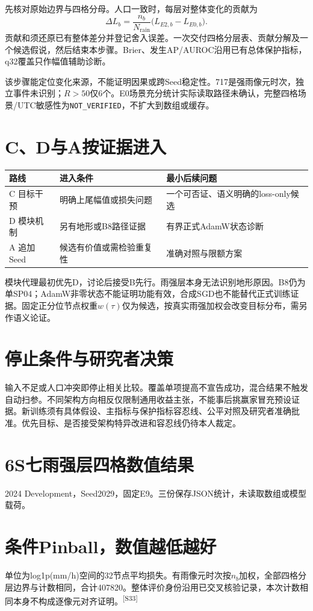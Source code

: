 \documentclass[UTF8,10.5pt,a4paper,fontset=none]{ctexart}
\newcommand{\evi}[1]{\textsuperscript{\color{muted}[#1]}}
\newcommand{\pageheading}[2]{\clearpage\section*{#1}\textcolor{muted}{#2}\par\vspace{3pt}}
\begin{document}
先核对原始边界与四格分母。人口一致时，每层对整体变化的贡献为
\[\Delta L_b=\frac{n_b}{N_{\mathrm{rain}}}\bigl(L_{E2,b}-L_{E0,b}\bigr).\]
贡献和须还原已有整体差分并登记舍入误差。一次交付四格分层表、贡献分解及一个候选假说，然后结束本步骤。Brier、发生AP/AUROC沿用已有总体保护指标，q32覆盖只作幅值辅助诊断。

该步骤能定位变化来源，不能证明因果或跨Seed稳定性。717是强雨像元时次，独立事件未识别；$R>50$仅6个。E0场景充分统计实际读取路径未确认，完整四格场景/UTC敏感性为\texttt{NOT\_VERIFIED}，不扩大到数组或缓存。

\section*{C、D与A按证据进入}
\begin{tabularx}{\textwidth}{@{}lXX@{}}
\toprule 路线 & 进入条件 & 最小后续问题\\\midrule
C 目标干预 & 明确上尾幅值或损失问题 & 一个可否证、语义明确的loss-only候选\\
D 模块机制 & 另有地形或B8路径证据 & 有界正式AdamW状态诊断\\
A 追加Seed & 候选有价值或需检验重复性 & 准确对照与限额方案\\
\bottomrule
\end{tabularx}

模块代理最初优先D，讨论后接受B先行。雨强层本身无法识别地形原因。B8仍为单SP04；AdamW非零状态不能证明功能有效，合成SGD也不能替代正式训练证据。固定正分位节点权重$w(\tau)$仅为候选，按真实雨强加权会改变目标分布，需另作语义论证。

\section*{停止条件与研究者决策}
输入不足或人口冲突即停止相关比较。覆盖单项提高不宣告成功，混合结果不触发自动扫参。不同架构方向相反仅限制通用收益主张，不能事后挑赢家冒充预设证据。新训练须有具体假设、主指标与保护指标容忍线、公平对照及研究者准确批准。优先目标、是否接受架构特异改进和容忍线仍待本人裁定。

\pageheading{6S\quad 七雨强层四格数值结果}{2024 Development，Seed2029，固定E9。三份保存JSON统计，未读取数组或模型载荷。}
\section*{条件Pinball，数值越低越好}
单位为log1p(mm/h)空间的32节点平均损失。有雨像元时次按$n_b$加权，全部四格分层边界与计数相同，合计407820。整体评价身份沿用已交叉核验记录，本次计数相同本身不构成逐像元对齐证明。\evi{S33}
\end{document}
